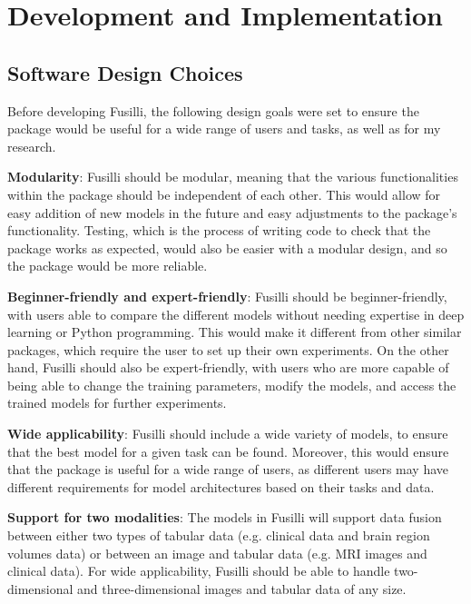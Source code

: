 \section{Development and Implementation}

\subsection{Software Design Choices}

Before developing Fusilli, the following design goals were set to ensure the package would be useful for a wide range of users and tasks, as well as for my research.
\vspace{0.3cm}

\noindent\textbf{Modularity}: Fusilli should be modular, meaning that the various functionalities within the package should be independent of each other.
This would allow for easy addition of new models in the future and easy adjustments to the package's functionality.
Testing, which is the process of writing code to check that the package works as expected, would also be easier with a modular design, and so the package would be more reliable.

\vspace{0.3cm}

\noindent\textbf{Beginner-friendly and expert-friendly}:  Fusilli should be beginner-friendly, with users able to compare the different models without needing expertise in deep learning or Python programming.
This would make it different from other similar packages, which require the user to set up their own experiments.
On the other hand, Fusilli should also be expert-friendly, with users who are more capable of being able to change the training parameters, modify the models, and access the trained models for further experiments.

\vspace{0.3cm}

\noindent\textbf{Wide applicability}:
Fusilli should include a wide variety of models, to ensure that the best model for a given task can be found.
Moreover, this would ensure that the package is useful for a wide range of users, as different users may have different requirements for model architectures based on their tasks and data.

\vspace{0.3cm}

\noindent\textbf{Support for two modalities}: The models in Fusilli will support data fusion between either two types of tabular data (e.g. clinical data and brain region volumes data) or between an image and tabular data (e.g. MRI images and clinical data).
For wide applicability, Fusilli should be able to handle two-dimensional and three-dimensional images and tabular data of any size.

